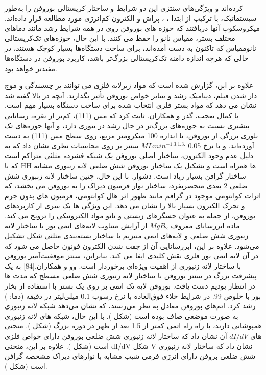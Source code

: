 کرده‌اند و ویژگی‌های سنتزی این دو شرایط و ساختار کریستالی بوروفن را به‌طور سیستماتیک، با ترکیب از ابتدا ، ، پراش و الکترون کم‌انرژی مورد مطالعه قرار داده‌اند. میکروسکوپ آنها دریافتند که حوزه های بوروفن روی  در همه شرایط رشد مانند دماهای مختلف بستر، مقیاس نانو را حفظ می کنند. با این حال، حوزه‌های تک‌کریستالی نانومقیاس که تاکنون به دست آمده‌اند، برای ساخت دستگاه‌ها بسیار کوچک هستند، در حالی که هرچه اندازه دامنه تک‌کریستالی بزرگ‌تر باشد، کاربرد بوروفن در دستگاه‌ها مفیدتر خواهد بود.

علاوه بر این، گزارش شده است که مواد زیرلایه فلزی می توانند بر چسبندگی و موج دار شدن فیلم، دینامیک رشد و سایر خواص بوروفن تأثیر بگذارند. آنچه در بالا گفته شد نشان می دهد که مواد بستر فلزی انتخاب شده برای ساخت دستگاه بسیار مهم است. با کمال تعجب، گذر و همکاران. ثابت کرد که مس (111)، کم‌تر از نقره، رسانایی بیشتری نسبت به حوزه‌های بزرگ‌تر در حال رشد در تئوری دارد، و آنها حوزه‌های تک بلوری بزرگی از بوروفن، تا اندازه 100 میکرومتر مربع، روی سطح مس (111) به دست آورده‌اند.  و با نرخ 0.05 $ML min^{-1. 3.1.3.}$ سنتز بر روی  محاسبات نظری نشان داد که به دلیل عدم وجود الکترون، ساختار اصلی بوروفن یک شبکه فشرده مثلثی متراکم است که با HH ها همراه است و تشکیل یک ساختار بوروفن شش ضلعی لانه زنبوری مشابه ساختار گرافن بسیار زیاد است. دشوار. با این حال، چنین ساختار لانه زنبوری شش ضلعی 2 بعدی منحصربفرد، ساختار نوار فرمیون دیراک را به بوروفن می بخشد، که اثرات کوانتومی موجود در گرافم مانند ظهور اثر هال کوانتومی، فرمیون های بدون جرم و تحرک الکترون بسیار بالا را نشان می دهد. این ویژگی ها یک سری از کاربردهای بوروفن، از جمله به عنوان حسگرهای زیستی و نانو مواد الکترونیکی را ترویج می کند. ماده ابررسانای معروف $MgB_2$ از آرایش متناوب لایه‌های اتمی بور با ساختار لانه زنبوری شش ضلعی و لایه‌های اتمی منیزیم با ساختار بسته‌بندی مثلثی شکل تشکیل می‌شود. علاوه بر این، ابررسانایی آن از جفت شدن الکترون-فونون حاصل می شود که در آن لایه اتمی بور فلزی نقش کلیدی ایفا می کند. بنابراین، سنتز موفقیت‌آمیز بوروفن با ساختار لانه زنبوری از اهمیت ویژه‌ای برخوردار است. وو و همکاران.[84] به یک پیشرفت بزرگ در سنتز بوروفن با ساختار لانه زنبوری شش ضلعی مسطح که مدت ها در انتظار بودیم دست یافت. بوروفن لایه تک اتمی بر روی یک بستر  با استفاده از بخار بور با خلوص 99. در شرایط خلاء فوق‌العاده با نرخ رسوب 0.1 میلی‌لیتر در دقیقه (دما: ) رشد کرد. اتم‌های بوروفن معادل به نظر می‌رسند، که نشان می‌دهد شبکه لانه زنبوری به صورت موضعی صاف بوده است (شکل ). با این حال، شبکه های لانه زنبوری همپوشانی دارند، با راه راه اتمی کمتر از 1.5 بعد از ظهر در دوره بزرگ (شکل ). منحنی های $dI/dV$ آن نشان داد که ساختار لانه زنبوری شش ضلعی بوروفن دارای خواص فلزی است (شکل ). علاوه بر این، منحنی dI/dV شکل V نشان داد که ساختار لانه زنبوری شش ضلعی بروفن دارای انرژی فرمی شیب مشابه با نوارهای دیراک مشخصه گرافن است (شکل ). 
